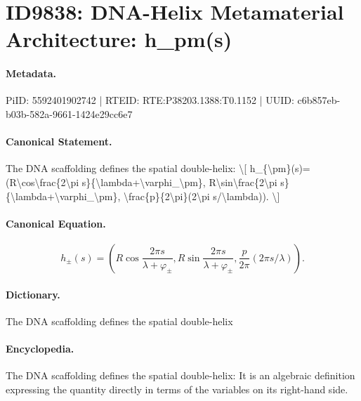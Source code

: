 \section*{ID9838: DNA-Helix Metamaterial Architecture: h\_pm(s)}
\paragraph{Metadata.}
PiID: 5592401902742 | RTEID: RTE:P38203.1388:T0.1152 | UUID: c6b857eb-b03b-582a-9661-1424e29cc6e7

\paragraph{Canonical Statement.}
The DNA scaffolding defines the spatial double-helix: \textbackslash{}[ h\_\{\textbackslash{}pm\}(s)=(R\textbackslash{}cos\textbackslash{}frac\{2\textbackslash{}pi s\}\{\textbackslash{}lambda+\textbackslash{}varphi\_\textbackslash{}pm\}, R\textbackslash{}sin\textbackslash{}frac\{2\textbackslash{}pi s\}\{\textbackslash{}lambda+\textbackslash{}varphi\_\textbackslash{}pm\}, \textbackslash{}frac\{p\}\{2\textbackslash{}pi\}(2\textbackslash{}pi s/\textbackslash{}lambda)). \textbackslash{}]

\paragraph{Canonical Equation.}
\[
h_{\pm}(s)=(R\cos\frac{2\pi s}{\lambda+\varphi_\pm}, R\sin\frac{2\pi s}{\lambda+\varphi_\pm}, \frac{p}{2\pi}(2\pi s/\lambda)).
\]

\paragraph{Dictionary.}
The DNA scaffolding defines the spatial double-helix

\paragraph{Encyclopedia.}
The DNA scaffolding defines the spatial double-helix: It is an algebraic definition expressing the quantity directly in terms of the variables on its right-hand side.
